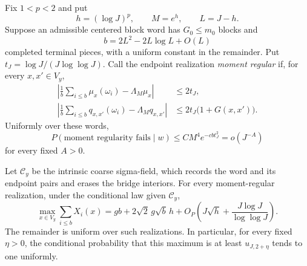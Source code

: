 \begin{lemma}
\label{lem:terminal-maximum-lower}
Fix $1<p<2$ and put
\[
 h=(\log J)^p,\qquad M=e^h,\qquad L=J-h.
\]
Suppose an admissible centered block word has $G_0\le m_0$ blocks and
\begin{equation}
 b=2L^2-2L\log L+O(L)
 \tag{63}\label{eq:terminal-piece-count}
\end{equation}
completed terminal pieces, with a uniform constant in the remainder.
Put $t_J=\log J/(J\log\log J)$.  Call the endpoint realization
\emph{moment regular} if, for every $x,x'\in V_y$,
\begin{equation}
 \begin{split}
 \left|\frac1b\sum_{i\le b}\mu_x(\omega_i)-\Lambda_M\mu_x\right|
 &\le 2t_J,\\
 \left|\frac1b\sum_{i\le b}q_{x,x'}(\omega_i)
                    -\Lambda_Mq_{x,x'}\right|
 &\le 2t_J\bigl(1+G(x,x')\bigr).
 \end{split}
 \tag{L1}\label{eq:terminal-moment-regularity}
\end{equation}
Uniformly over these words,
\begin{equation}
 P(\text{moment regularity fails}\mid w)
 \le CM^4e^{-cbt_J^2}=o(J^{-A})
 \tag{L2}\label{eq:terminal-moment-failure}
\end{equation}
for every fixed $A>0$.

Let $\mathcal C_y$ be the intrinsic coarse sigma-field, which records
the word and its endpoint pairs and erases the bridge interiors.
For every moment-regular realization, under the conditional law given
$\mathcal C_y$,
\begin{equation}
 \max_{x\in V_y}\sum_{i\le b}X_i(x)
 =gb+2\sqrt2\,g\sqrt b\,h
 +O_P\left(J\sqrt h+\frac{J\log J}{\log\log J}\right).
 \tag{L3}\label{eq:terminal-maximum-expansion}
\end{equation}
The remainder is uniform over such realizations.  In particular, for
every fixed $\eta>0$, the conditional probability that this maximum
is at least $u_{J,2+\eta}$ tends to one uniformly.
\end{lemma}

